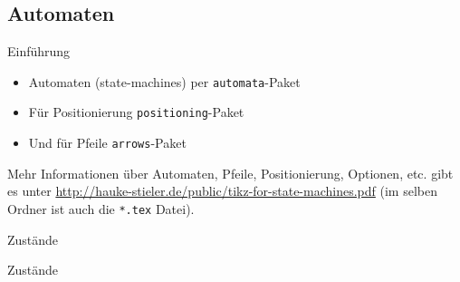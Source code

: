 \documentclass{beamer}
\begin{document}
		
		\subsection{Automaten}

		\begin{frame}[containsverbatim]{Einführung}
			\begin{itemize}
				\item Automaten (state-machines) per \texttt{automata}-Paket
				\item Für Positionierung \texttt{positioning}-Paket
				\item Und für Pfeile \texttt{arrows}-Paket
			\end{itemize}
			Mehr Informationen über Automaten, Pfeile, Positionierung, Optionen, etc. gibt es unter \href{http://hauke-stieler.de/public/tikz-for-state-machines.pdf}{http://hauke-stieler.de/public/tikz-for-state-machines.pdf} (im selben Ordner ist auch die \texttt{*.tex} Datei).
		\end{frame}


		\begin{frame}[containsverbatim]{Zustände}
			\begin{smallerlatexcode}
\usetikzlibrary{
	automata,
	arrows}
			\end{smallerlatexcode}
		\end{frame}


		\begin{frame}[containsverbatim]{Zustände}
			\begin{center}
				\vspace{0.5cm}
			\end{center}
		\end{frame}
\end{document}
